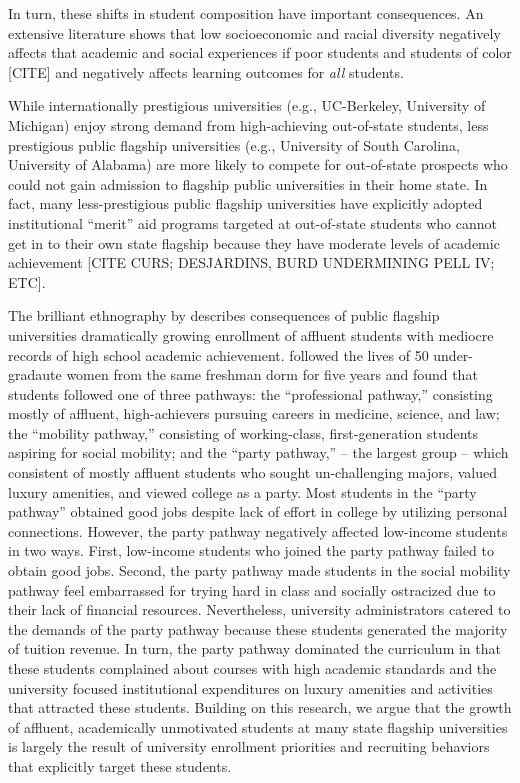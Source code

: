 \documentclass[twoside]{article}
\begin{document}
In turn, these shifts in student composition have important consequences.  An extensive literature shows that low socioeconomic and racial diversity negatively affects that academic and social experiences if poor students and students of color [CITE] and negatively affects learning outcomes for \textit{all} students.  

While internationally prestigious universities (e.g., UC-Berkeley, University of Michigan) enjoy strong demand from high-achieving out-of-state students, less prestigious public flagship universities (e.g., University of South Carolina, University of Alabama) are more likely to compete for out-of-state prospects who could not gain admission to flagship public universities in their home state.  In fact, many less-prestigious public flagship universities have explicitly adopted institutional ``merit'' aid programs targeted at out-of-state students who cannot get in to their own state flagship because they have moderate levels of academic achievement [CITE CURS; DESJARDINS, BURD UNDERMINING PELL IV; ETC].


The brilliant ethnography by \cite{RN4231} describes consequences of public flagship universities dramatically growing enrollment of affluent students with mediocre records of high school academic achievement. \cite{RN4231} followed the lives of 50 under-gradaute women from the same freshman dorm for five years and found that students followed one of three pathways: the ``professional pathway,'' consisting mostly of affluent, high-achievers pursuing careers in medicine, science, and law; the ``mobility pathway,'' consisting of working-class, first-generation students aspiring for social mobility; and the ``party pathway,'' -- the largest group -- which consistent of mostly affluent students who sought un-challenging majors, valued luxury amenities, and viewed college as a party. Most students in the ``party pathway'' obtained good jobs despite lack of effort in college by utilizing personal connections. However, the party pathway negatively affected low-income students in two ways. First, low-income students who joined the party pathway failed to obtain good jobs. Second, the party pathway made students in the social mobility pathway feel embarrassed for trying hard in class and socially ostracized due to their lack of financial resources.  Nevertheless, university administrators catered to the demands of the party pathway because these students generated the majority of tuition revenue. In turn, the party pathway dominated the curriculum in that these students complained about courses with high academic standards and the university focused institutional expenditures on luxury amenities and activities that attracted these students. Building on this research, we argue that the growth of affluent, academically unmotivated students at many state flagship universities is largely the result of university enrollment priorities and recruiting behaviors that explicitly target these students.
\end{document}

